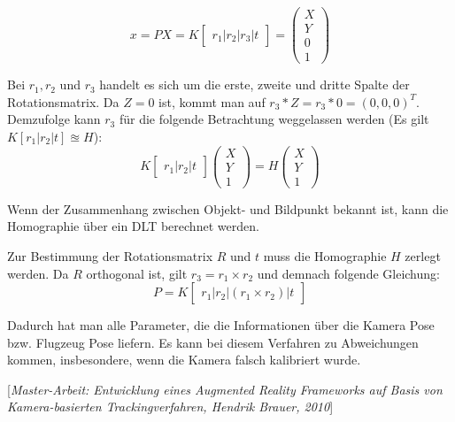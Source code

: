 \documentclass{ezb}
\begin{document}
\begin{equation}
x=PX=K
\begin{bmatrix}
r_{1} | r_{2} | r_{3} | t 
\end{bmatrix}
=
\begin{pmatrix}
X \\
Y \\
0 \\
1
\end{pmatrix}
\end{equation} 

Bei $r_{1}, r_{2}$ und $r_{3}$ handelt es sich um die erste, zweite und dritte Spalte der Rotationsmatrix. Da $Z=0$ ist, kommt man auf $r_{3} * Z = r_{3} * 0 = (0,0,0)^T$. Demzufolge kann $r_{3}$ für die folgende Betrachtung weggelassen werden (Es gilt $K[r_{1}|r_{2}|t] \approxeq H$):
\begin{equation}
K
\begin{bmatrix}
r_{1} | r_{2} | t 
\end{bmatrix}
\begin{pmatrix}
X \\
Y \\
1
\end{pmatrix}
=H
\begin{pmatrix}
X \\
Y \\
1
\end{pmatrix}
\end{equation} 

Wenn der Zusammenhang zwischen Objekt- und Bildpunkt bekannt ist, kann die Homographie über ein DLT berechnet werden. 

Zur Bestimmung der Rotationsmatrix $R$ und $t$ muss die Homographie $H$ zerlegt werden. Da $R$ orthogonal ist, gilt $r_3 = r_1 \times r_2$ und demnach folgende Gleichung:
\begin{equation}
P=K
\begin{bmatrix}
r_{1} | r_{2} | (r_1 \times r_2)| t 
\end{bmatrix}
\end{equation} 

Dadurch hat man alle Parameter, die die Informationen über die Kamera Pose bzw. Flugzeug Pose liefern. Es kann bei diesem Verfahren zu Abweichungen kommen, insbesondere, wenn die Kamera falsch kalibriert wurde.

[\textit{Master-Arbeit: Entwicklung eines Augmented Reality
Frameworks auf Basis von Kamera-basierten
Trackingverfahren, Hendrik Brauer, 2010}]


\end{document}
